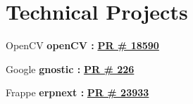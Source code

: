 \documentclass[letterpaper]{deedy-resume} %
\begin{document}
\begin{minipage}[t]{0.66\textwidth}
\sectionspace %

\section{Technical Projects}

\vspace{0.2cm}
\begin{tightitemize}
\item OpenCV {\bf openCV :} \hspace{0.1cm} \href{https://github.com/opencv/opencv/pull/18590}{\textbf{PR \# 18590}}
\item Google {\bf gnostic :} \hspace{0.1cm} \href{https://github.com/google/gnostic/pull/226}{\textbf{PR \# 226}}
\item Frappe {\bf erpnext :} \hspace{0.1cm} \href{https://github.com/frappe/erpnext/pull/23933}{\textbf{PR \# 23933}}
\end{tightitemize}

\end{minipage}
\end{document}
